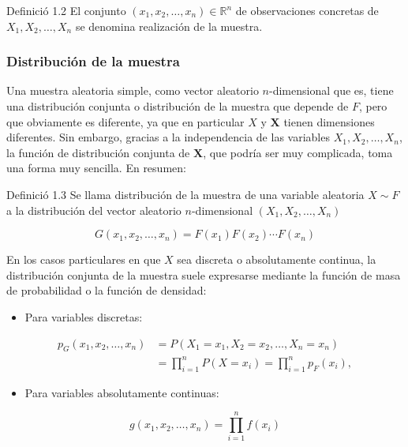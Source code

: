 \documentclass[
]{article}
\providecommand{\tightlist}{%
  \setlength{\itemsep}{0pt}\setlength{\parskip}{0pt}}
\begin{document}
Definició 1.2 El conjunto \(\left(x_{1}, x_{2}, \ldots, x_{n}\right) \in \mathbb{R}^{n}\) de observaciones concretas de \(X_{1}, X_{2}, \ldots, X_{n}\) se denomina realización de la muestra.

\subsubsection{Distribución de la muestra}\label{distribuciuxf3n-de-la-muestra}

Una muestra aleatoria simple, como vector aleatorio \(n\)-dimensional que es, tiene una distribución conjunta o distribución de la muestra que depende de \(F\), pero que obviamente es diferente, ya que en particular \(X\) y \(\mathbf{X}\) tienen dimensiones diferentes. Sin embargo, gracias a la independencia de las variables \(X_{1}, X_{2}, \ldots, X_{n}\), la función de distribución conjunta de \(\mathbf{X}\), que podría ser muy complicada, toma una forma muy sencilla. En resumen:

Definició 1.3 Se llama distribución de la muestra de una variable aleatoria \(X \sim F\) a la distribución del vector aleatorio \(n\)-dimensional \(\left(X_{1}, X_{2}, \ldots, X_{n}\right)\)

\[
G\left(x_{1}, x_{2}, \ldots, x_{n}\right)=F\left(x_{1}\right) F\left(x_{2}\right) \cdots F\left(x_{n}\right)
\]

En los casos particulares en que \(X\) sea discreta o absolutamente continua, la distribución conjunta de la muestra suele expresarse mediante la función de masa de probabilidad o la función de densidad:

\begin{itemize}
\tightlist
\item
  Para variables discretas:
\end{itemize}

\[
\begin{aligned}
p_{G}\left(x_{1}, x_{2}, \ldots, x_{n}\right) & =P\left(X_{1}=x_{1}, X_{2}=x_{2}, \ldots, X_{n}=x_{n}\right) \\
& =\prod_{i=1}^{n} P\left(X=x_{i}\right)=\prod_{i=1}^{n} p_{F}\left(x_{i}\right),
\end{aligned}
\]

\begin{itemize}
\tightlist
\item
  Para variables absolutamente continuas:
\end{itemize}

\[
g\left(x_{1}, x_{2}, \ldots, x_{n}\right)=\prod_{i=1}^{n} f\left(x_{i}\right)
\]
\end{document}

